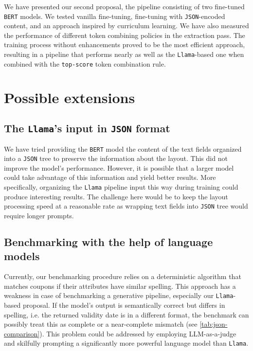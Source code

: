 \documentclass[licencjacka,en]{pracamgr}
\let\cleardoublepage\clearpage
\begin{document}
We have presented our second proposal, the pipeline consisting of two fine-tuned \texttt{BERT} models. We tested vanilla fine-tuning, fine-tuning with \texttt{JSON}-encoded content, and an approach inspired by curriculum learning. We have also measured the performance of different token combining policies in the extraction pass. The training process without enhancements proved to be the most efficient approach, resulting in a pipeline that performs nearly as well as the \texttt{Llama}-based one when combined with the \texttt{top-score} token combination rule.
\section{Possible extensions}
\subsection{The \texttt{Llama}'s input in \texttt{JSON} format}
We have tried providing the \texttt{BERT} model the content of the text fields organized into a \texttt{JSON} tree to preserve the information about the layout. This did not improve the model's performance. However, it is possible that a larger model could take advantage of this information and yield better results. More specifically, organizing the \texttt{Llama} pipeline input this way during training could produce interesting results. The challenge here would be to keep the layout processing speed at a reasonable rate as wrapping text fields into \texttt{JSON} tree would require longer prompts.
\subsection{Benchmarking with the help of language models}
Currently, our benchmarking procedure relies on a deterministic algorithm that matches coupons if their attributes have similar spelling. This approach has a weakness in case of benchmarking a generative pipeline, especially our \texttt{Llama}-based proposal. If the model's output is semantically correct but differs in spelling, i.e. the returned validity date is in a different format, the benchmark can possibly treat this as complete or a near-complete mismatch (see \ref{tab:json-comparison}). This problem could be addressed by employing LLM-as-a-judge and skilfully prompting a significantly more powerful language model than \texttt{Llama}.

\let\cleardoublepage\clearpage
\end{document}
